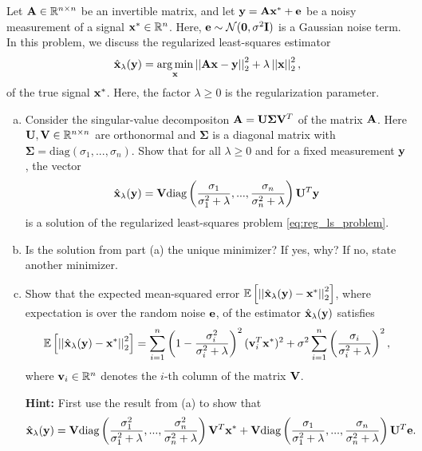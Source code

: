 \documentclass[11pt,a4paper]{article}
\DeclareMathOperator*{\argmin}{arg\,min}
\newcommand\mSigma{\bm \Sigma}
\renewcommand{\norm}[1]{\left|\left| #1 \right|\right|}
\newcommand{\diag}[1]{\text{diag}\left(#1\right)}
\begin{document}
\begin{problem}	
Let $\mathbf A \in \mathbb R^{n\times n}$ be an invertible matrix, and let $\mathbf y = \mathbf A \mathbf x^* + \mathbf e$ be a noisy measurement of a signal $\mathbf x^* \in \mathbb R^n$. Here, $\mathbf e \sim \mathcal{N}(\mathbf{0}, \sigma^2 \mathbf I)$ is a Gaussian noise term. In this problem, we discuss the regularized least-squares estimator
		\begin{equation}
		\label{eq:reg_ls_problem}
			\hat{\vx}_\lambda(\vy) = \argmin_\vx \norm{\mA \vx - \vy}_2^2 + \lambda \norm{\vx}_2^2,
		\end{equation}
	of the true signal $\mathbf x^*$. Here, the factor $\lambda \geq 0$ is the regularization parameter. 
	
	\begin{enumerate}[(a)]
		\item Consider the singular-value decompositon $\mA = \mU \mSigma \mV^T$ of the matrix $\mathbf A$. Here $\mathbf U, \mathbf V \in \mathbb{R}^{n \times n}$ are orthonormal and $\mSigma$ is  a diagonal matrix with $\mSigma = \diag{\sigma_1,...,\sigma_n}$. Show that for all $\lambda \geq 0$ and for a fixed measurement $\mathbf y$, the vector
			\begin{equation*}
				\hat{\vx}_\lambda (\vy) = \mV \diag{\frac{\sigma_1}{\sigma_1^2+\lambda}, ..., \frac{\sigma_n}{\sigma_n^2+\lambda}} \mU^T \vy
			\end{equation*}
		is a solution of the regularized least-squares problem \eqref{eq:reg_ls_problem}.
		\item Is the solution from part (a) the unique minimizer? If yes, why? If no, state another minimizer. 
		
		\item  Show that the expected mean-squared error $\EX{  \norm{\hat{\vx}_\lambda(\vy) - \vx^*}_2^2 }$, where expectation is over the random noise $\mathbf e$, of the estimator $\hat{\mathbf x}_\lambda(\mathbf y)$ satisfies
			\begin{equation*}
				\EX{ \norm{\hat{\vx}_\lambda(\vy) - \vx^*}_2^2 } = \sum_{i=1}^n \left( 1 - \frac{\sigma_i^2}{\sigma_i^2+\lambda} \right)^2 (\vv_i^T \vx^*)^2 + \sigma^2 \sum_{i=1}^n \left( \frac{\sigma_i}{\sigma_i^2+\lambda}\right)^2,
			\end{equation*}
		where $\mathbf v_i \in \mathbb R^n$ denotes the $i$-th column of the matrix $\mathbf V$. 		
		
		\textbf{Hint:} First use the result from (a) to show that
			\begin{equation*}
				\hat{\vx}_\lambda (\vy) = \mV \diag{\frac{\sigma_1^2}{\sigma_1^2+\lambda}, ..., \frac{\sigma_n^2}{\sigma_n^2+\lambda}} \mV^T \vx^* +  \mV \diag{\frac{\sigma_1}{\sigma_1^2+\lambda}, ..., \frac{\sigma_n}{\sigma_n^2+\lambda}} \mU^T \ve.
			\end{equation*}
		

\end{enumerate}
\end{problem}
\end{document}
